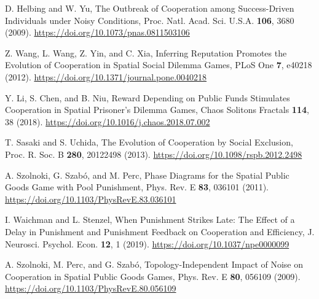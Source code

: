 \begin{thebibliography}{04}
D. Helbing and W. Yu, The Outbreak of Cooperation among Success-Driven Individuals under Noisy Conditions, Proc. Natl. Acad. Sci. U.S.A. \textbf{106}, 3680 (2009). \url{https://doi.org/10.1073/pnas.0811503106}

Z. Wang, L. Wang, Z. Yin, and C. Xia, Inferring Reputation Promotes the Evolution of Cooperation in Spatial Social Dilemma Games, PLoS One \textbf{7}, e40218 (2012). \url{https://doi.org/10.1371/journal.pone.0040218}

Y. Li, S. Chen, and B. Niu, Reward Depending on Public Funds Stimulates Cooperation in Spatial Prisoner’s Dilemma Games, Chaos Solitons Fractals \textbf{114}, 38 (2018). \url{https://doi.org/10.1016/j.chaos.2018.07.002}

T. Sasaki and S. Uchida, The Evolution of Cooperation by Social Exclusion, Proc. R. Soc. B \textbf{280}, 20122498 (2013). \url{https://doi.org/10.1098/rspb.2012.2498}

A. Szolnoki, G. Szabó, and M. Perc, Phase Diagrams for the Spatial Public Goods Game with Pool Punishment, Phys. Rev. E \textbf{83}, 036101 (2011). \url{https://doi.org/10.1103/PhysRevE.83.036101}

I. Waichman and L. Stenzel, When Punishment Strikes Late: The Effect of a Delay in Punishment and Punishment Feedback on Cooperation and Efficiency, J. Neurosci. Psychol. Econ. \textbf{12}, 1 (2019). \url{https://doi.org/10.1037/npe0000099}

A. Szolnoki, M. Perc, and G. Szabó, Topology-Independent Impact of Noise on Cooperation in Spatial Public Goods Games, Phys. Rev. E \textbf{80}, 056109 (2009). \url{https://doi.org/10.1103/PhysRevE.80.056109}




\end{thebibliography}






